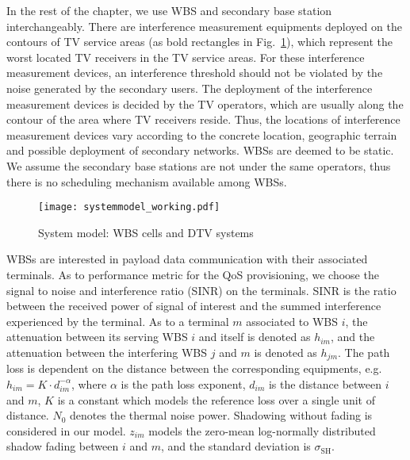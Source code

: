 In the rest of the chapter, we use WBS and secondary base station interchangeably. 
There are interference measurement equipments deployed on the contours of TV service areas (as bold rectangles in Fig.~\ref{sysmodel}), which represent the worst located TV receivers in the TV service areas. 
For these interference measurement devices, an interference threshold should not be violated by the noise generated by the secondary users.
The deployment of the interference measurement devices is decided by the TV operators, which are usually along the contour of the area where TV receivers reside.
Thus, the locations of interference measurement devices vary according to the concrete location, geographic terrain and possible deployment of secondary networks. 
WBSs are deemed to be static.
We assume the secondary base stations are not under the same operators, thus there is no scheduling mechanism available among WBSs.



\begin{figure}[h!]
  \centering
  \texttt{[image: systemmodel\_working.pdf]}
  \caption{System model: WBS cells and DTV systems}
\label{sysmodel}
\end{figure}

WBSs are interested in payload data communication with their associated terminals. 
As to performance metric for the \gls{QoS} provisioning, we choose the signal to noise and interference ratio (\gls{SINR}) on the terminals.
SINR is the ratio between the received power of signal of interest and the summed interference experienced by the terminal. 
%
As to a terminal $m$ associated to WBS $i$, the attenuation between its serving WBS $i$ and itself is denoted as $h_{im}$, and the attenuation between the interfering WBS $j$ and $m$ is denoted as $h_{jm}$.
The path loss is dependent on the distance between the corresponding equipments, e.g. $h_{im}=K \cdot d_{im}^{-\alpha}$, where $\alpha$ is the path loss exponent, $d_{im}$ is the distance between $i$ and $m$, $K$ is a constant which models the reference loss over a single unit of distance.  
$N_0$ denotes the thermal noise power.
Shadowing without fading is considered in our model.
$z_{im}$ models the zero-mean log-normally distributed shadow fading between $i$ and $m$, and the standard deviation is $\sigma_{\text{SH}}$.

